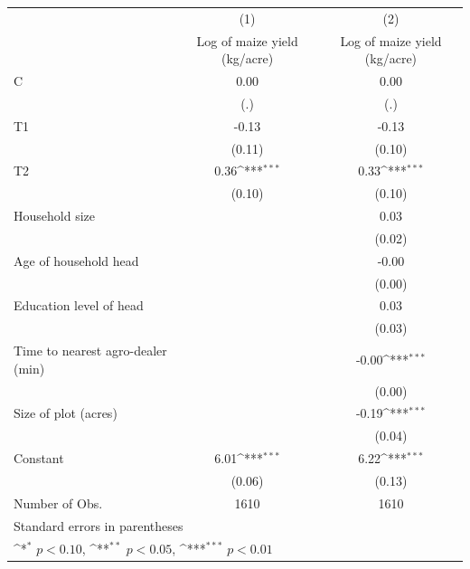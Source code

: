 {
\def\sym#1{\ifmmode^{#1}\else\(^{#1}\)\fi}
\begin{tabular}{l*{2}{c}}
\hline\hline
                    &\multicolumn{1}{c}{(1)}&\multicolumn{1}{c}{(2)}\\
                    &\multicolumn{1}{c}{Log of maize yield (kg/acre)}&\multicolumn{1}{c}{Log of maize yield (kg/acre)}\\
\hline
C                   &        0.00         &        0.00         \\
                    &         (.)         &         (.)         \\
[1em]
T1                  &       -0.13         &       -0.13         \\
                    &      (0.11)         &      (0.10)         \\
[1em]
T2                  &        0.36\sym{***}&        0.33\sym{***}\\
                    &      (0.10)         &      (0.10)         \\
[1em]
Household size      &                     &        0.03         \\
                    &                     &      (0.02)         \\
[1em]
Age of household head&                     &       -0.00         \\
                    &                     &      (0.00)         \\
[1em]
Education level of head&                     &        0.03         \\
                    &                     &      (0.03)         \\
[1em]
Time to nearest agro-dealer (min)&                     &       -0.00\sym{***}\\
                    &                     &      (0.00)         \\
[1em]
Size of plot (acres)&                     &       -0.19\sym{***}\\
                    &                     &      (0.04)         \\
[1em]
Constant            &        6.01\sym{***}&        6.22\sym{***}\\
                    &      (0.06)         &      (0.13)         \\
\hline
Number of  Obs.     &        1610         &        1610         \\
\hline\hline
\multicolumn{3}{l}{\footnotesize Standard errors in parentheses}\\
\multicolumn{3}{l}{\footnotesize \sym{*} \(p<0.10\), \sym{**} \(p<0.05\), \sym{***} \(p<0.01\)}\\
\end{tabular}
}
